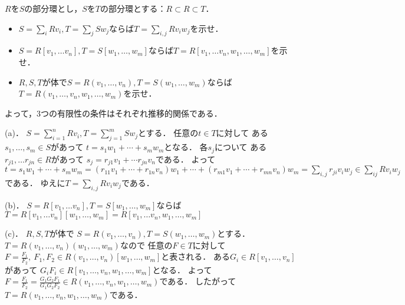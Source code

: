 \begin{prob}
  $R$を$S$の部分環とし，$S$を$T$の部分環とする：$R \subset R \subset T$．
  \begin{itemize}
  \item[(a)] $S = \sum_i Rv_i, T = \sum_j S w_j$ならば$ T = \sum_{i,j} R v_i w_j $を示せ．
  \item[(b)] $S = R[v_1, \dots v_n], T = S[w_1, \dots ,w_m]$ならば$T = R[v_1, \dots v_n, w_1, \dots ,w_m]$を示せ．
  \item[(c)] $R,S,T$が体で$S = R(v_1,\dots,v_n), T = S(w_1, \dots, w_m )$ならば$ T = R(v_1,\dots,v_n, w_1, \dots, w_m )$を示せ．
  \end{itemize}
  よって，3つの有限性の条件はそれぞれ推移的関係である．
\end{prob}
\begin{ans}
  (a)．
  $S = \sum_{i=1}^n Rv_i, T = \sum_{j=1}^m S w_j$とする．
  任意の$t \in T$に対して
  ある$s_1, \dots , s_m \in S$があって
  $ t = s_1 w_1 + \cdots + s_m w_m $となる．
  各$s_j$について
  ある$ r_{j1}, \dots r_{jn} \in R $があって
  $ s_j = r_{j1} v_1 + \cdots r_{jn} v_n $である．
  よって
  $ t = s_1 w_1 + \cdots + s_m w_m
  = (r_{11} v_1 + \cdots + r_{1n} v_n ) w_1 + \cdots + (r_{m1} v_1 + \cdots + r_{mn} v_n ) w_m
  = \sum_{i,j} r_{ji} v_i w_j \in \sum_{ij} R v_i w_j $である．
  ゆえに$ T = \sum_{i,j} R v_i w_j $である．
  
  (b)．
  $S = R[v_1, \dots v_n], T = S[w_1, \dots ,w_m]$ならば
  $T = R[v_1, \dots v_n] [w_1, \dots ,w_m]
  =  R[v_1, \dots v_n, w_1, \dots ,w_m]$

  (c)．
  $R,S,T$が体で
  $S = R(v_1,\dots,v_n), T = S(w_1, \dots, w_m )$とする．
  $ T = R(v_1,\dots,v_n) (w_1, \dots, w_m )$なので
  任意の$F \in T $に対して
  $F = \frac{F_1}{F_2}, \ F_1,F_2 \in R(v_1,\dots,v_n)[w_1, \dots, w_m]$と表される．
  ある$G_i \in R[v_1, \dots, v_n] $があって
  $ G_i F_i \in R[v_1,\dots,v_n, w_1, \dots, w_m]$となる．
  よって$F = \frac{F_1}{F_2} = \frac{ G_1 G_2 F_1 }{ G_1 G_2 F_2 } \in R(v_1,\dots,v_n, w_1, \dots, w_m )$である．
  したがって$ T =  R(v_1,\dots,v_n, w_1, \dots, w_m )$である．
\end{ans}
